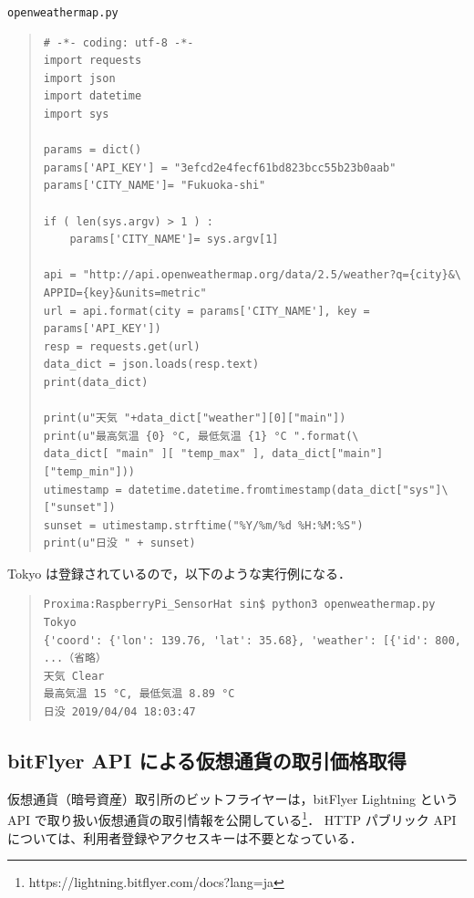 \documentclass[11pt,a4,epsf]{report}
\begin{document}
\begin{itembox}[l]{\tt openweathermap.py}
\begin{quote}
\small
\begin{verbatim}
# -*- coding: utf-8 -*-
import requests
import json
import datetime
import sys

params = dict()
params['API_KEY'] = "3efcd2e4fecf61bd823bcc55b23b0aab"
params['CITY_NAME']= "Fukuoka-shi"

if ( len(sys.argv) > 1 ) :
    params['CITY_NAME']= sys.argv[1]

api = "http://api.openweathermap.org/data/2.5/weather?q={city}&\
APPID={key}&units=metric"
url = api.format(city = params['CITY_NAME'], key = params['API_KEY'])
resp = requests.get(url)
data_dict = json.loads(resp.text)
print(data_dict)

print(u"天気 "+data_dict["weather"][0]["main"])
print(u"最高気温 {0} °C, 最低気温 {1} °C ".format(\
data_dict[ "main" ][ "temp_max" ], data_dict["main"]["temp_min"]))
utimestamp = datetime.datetime.fromtimestamp(data_dict["sys"]\
["sunset"])
sunset = utimestamp.strftime("%Y/%m/%d %H:%M:%S")
print(u"日没 " + sunset)
\end{verbatim}
\end{quote}
\end{itembox}

Tokyo は登録されているので，以下のような実行例になる．
\begin{quote}
\small
\begin{verbatim}
Proxima:RaspberryPi_SensorHat sin$ python3 openweathermap.py Tokyo
{'coord': {'lon': 139.76, 'lat': 35.68}, 'weather': [{'id': 800, ...（省略）
天気 Clear
最高気温 15 °C, 最低気温 8.89 °C
日没 2019/04/04 18:03:47
\end{verbatim}
\end{quote}

\subsection{bitFlyer API による仮想通貨の取引価格取得}

仮想通貨（暗号資産）取引所のビットフライヤーは，bitFlyer Lightning という API で取り扱い仮想通貨の取引情報を公開している\footnote{{\sf https://lightning.bitflyer.com/docs?lang=ja} }．
HTTP パブリック API については、利用者登録やアクセスキーは不要となっている．
\end{document}
